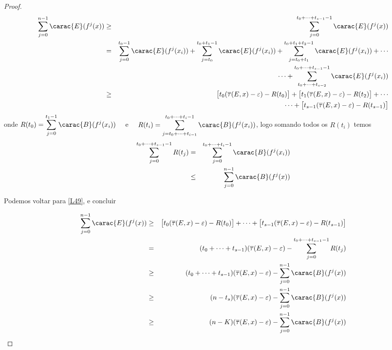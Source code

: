 \begin{proof}
\begin{eqnarray}
\sum_{j=0}^{n-1}\carac{E}(f^j(x)) & \geq & \sum_{j=0}^{t_0+\cdots+t_{s-1}-1}\carac{E}(f^j(x))\nonumber\\
 & = & \sum_{j=0}^{t_0-1}\carac{E}(f^j(x_i))+\sum_{j=t_0}^{t_0+t_1-1}\carac{E}(f^j(x_i))+\sum_{j=t_0+t_1}^{t_0+t_1+t_2-1}\carac{E}(f^j(x_i))+\cdots\nonumber\\
 && \cdots+\sum_{t_0+\cdots+t_{s-2}}^{t_0+\cdots+t_{s-1}-1}\carac{E}(f^j(x_i))\nonumber\\	
 & \geq & \big[t_0(\overline{\tau}(E,x)-\varepsilon)-R(t_0)\big]+\big[t_1(\overline{\tau}(E,x)-\varepsilon)-R(t_2)\big]+\cdots\nonumber\\
 & & \cdots+\big[t_{s-1}(\overline{\tau}(E,x)-\varepsilon)-R(t_{s-1})\big]\label{L49}
\end{eqnarray}\vspace{0.1cm}
onde $\displaystyle R(t_0)=\sum_{j=0}^{t_1-1}\carac{B}(f^j(x_i))\quad$ e $\quad\displaystyle R(t_i)=\sum_{j=t_0+\cdots+t_{i-1}}^{t_0+\cdots+t_i-1}\carac{B}(f^j(x_i))$, logo somando todos os $R(t_i)$ temos
\begin{eqnarray*}
\sum_{j=0}^{t_0+\cdots+t_{s-1}-1}R(t_j) & = & \sum_{j=0}^{t_0+\cdots+t_i-1}\carac{B}(f^j(x_i))\\
& \leq & \sum_{j=0}^{n-1}\carac{B}(f^j(x))
\end{eqnarray*}\vspace{0.1cm}

Podemos voltar para \eqref{L49}, e concluir

\begin{eqnarray*}
\sum_{j=0}^{n-1}\carac{E}(f^j(x)) & \geq & \big[t_0(\overline{\tau}(E,x)-\varepsilon)-R(t_0)\big]+\cdots+\big[t_{s-1}(\overline{\tau}(E,x)-\varepsilon)-R(t_{s-1})\big]\\
 & = & (t_0+\cdots+t_{s-1})(\overline{\tau}(E,x)-\varepsilon)-\sum_{j=0}^{t_0+\cdots+t_{s-1}-1}R(t_j)\\
 & \geq & (t_0+\cdots+t_{s-1})(\overline{\tau}(E,x)-\varepsilon)-\sum_{j=0}^{n-1}\carac{B}(f^j(x))\\
& \geq & (n-t_s)(\overline{\tau}(E,x)-\varepsilon)-\sum_{j=0}^{n-1}\carac{B}(f^j(x))\\
& \geq & (n-K)(\overline{\tau}(E,x)-\varepsilon)-\sum_{j=0}^{n-1}\carac{B}(f^j(x))
\end{eqnarray*}\vspace{0.1cm}


\end{proof}
